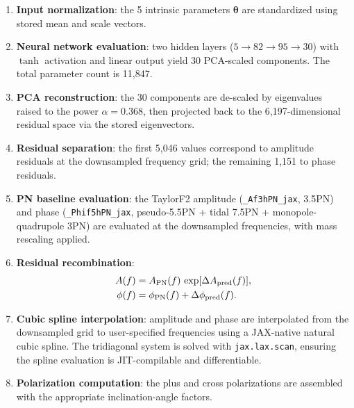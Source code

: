 \documentclass[twocolumn,superscriptaddress,nofootinbib,aps,prd]{revtex4-2}
\begin{document}
\begin{enumerate}
    \item \textbf{Input normalization}: the 5 intrinsic parameters
          $\bm{\theta}$ are standardized using stored mean and scale vectors.

    \item \textbf{Neural network evaluation}: two hidden layers
          ($5{\to}82{\to}95{\to}30$) with $\tanh$ activation and linear
          output yield 30 PCA-scaled components.  The total parameter count
          is 11,847.

    \item \textbf{PCA reconstruction}: the 30 components are de-scaled by
          eigenvalues raised to the power $\alpha = 0.368$, then projected
          back to the 6,197-dimensional residual space via the stored
          eigenvectors.

    \item \textbf{Residual separation}: the first 5,046 values correspond to
          amplitude residuals at the downsampled frequency grid; the
          remaining 1,151 to phase residuals.

    \item \textbf{PN baseline evaluation}: the TaylorF2 amplitude
          (\texttt{\_Af3hPN\_jax}, 3.5PN) and phase
          (\texttt{\_Phif5hPN\_jax}, pseudo-5.5PN + tidal 7.5PN +
          monopole-quadrupole 3PN) are evaluated at the downsampled
          frequencies, with mass rescaling applied.

    \item \textbf{Residual recombination}:
          \begin{align}
              A(f) &= A_{\rm PN}(f)\,\exp[\Delta A_{\rm pred}(f)],\\
              \phi(f) &= \phi_{\rm PN}(f) + \Delta\phi_{\rm pred}(f).
          \end{align}

    \item \textbf{Cubic spline interpolation}: amplitude and phase are
          interpolated from the downsampled grid to user-specified
          frequencies using a JAX-native natural cubic spline.  The
          tridiagonal system is solved with \texttt{jax.lax.scan}, ensuring
          the spline evaluation is JIT-compilable and differentiable.

    \item \textbf{Polarization computation}: the plus and cross polarizations
          are assembled with the appropriate inclination-angle factors.
\end{enumerate}
\end{document}

